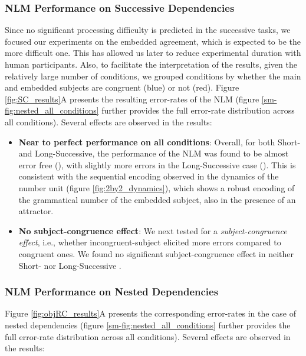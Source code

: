 \subsubsection{NLM Performance on Successive Dependencies}
Since no significant processing difficulty is predicted in the successive tasks, we focused our experiments on the embedded agreement, which is expected to be the more difficult one. This has allowed us later to reduce experimental duration with human participants. Also, to facilitate the interpretation of the results, given the relatively large number of conditions, we grouped conditions by whether the main and embedded subjects are congruent (blue) or not (red). Figure \ref{fig:SC_results}A presents the resulting error-rates of the NLM (figure \ref{sm-fig:nested_all_conditions} further provides the full error-rate distribution across all conditions). Several effects are observed in the results: 

\begin{itemize}
    \item \textbf{Near to perfect performance on all conditions}: Overall, for both Short- and Long-Successive, the performance of the NLM was found to be almost error free (), with slightly more errors in the Long-Successive case (). This is consistent with the sequential encoding observed in the dynamics of the number unit (figure \ref{fig:2by2_dynamics}), which shows a robust encoding of the grammatical number of the embedded subject, also in the presence of an attractor.
    \item \textbf{No subject-congruence effect}: We next tested for a \textit{subject-congruence effect}, i.e., whether incongruent-subject elicited more errors compared to congruent ones. We found no significant subject-congruence effect in neither Short- nor Long-Successive .
\end{itemize}
 
\subsubsection{NLM Performance on Nested Dependencies}
Figure \ref{fig:objRC_results}A presents the corresponding error-rates in the case of nested dependencies (figure \ref{sm-fig:nested_all_conditions} further provides the full error-rate distribution across all conditions). Several effects are observed in the results:

